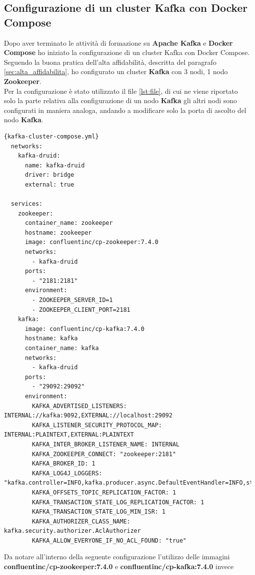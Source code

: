 \subsection{Configurazione di un cluster Kafka con Docker Compose}
Dopo aver terminato le attività di formazione su \textbf{Apache Kafka} e \textbf{Docker Compose} 
ho iniziato la configurazione di un \gls{cluster}{} Kafka con Docker Compose. 
\\Seguendo la buona pratica dell'alta affidabilità, descritta del 
paragrafo \ref{sec:alta_affidabilita}, ho configurato un \gls{cluster}{} \textbf{Kafka} con 3 nodi, 1 nodo \textbf{Zookeeper}.\\
Per la configurazione è stato utilizzato il file \ref{lst:file}, di cui ne viene riportato solo la parte relativa alla configurazione di un nodo \textbf{Kafka} gli altri nodi sono configurati in maniera analoga, andando a modificare
solo la porta di ascolto del nodo \textbf{Kafka}.
\pagebreak
\begin{lstlisting}[caption=\texttt{kafka-cluster-compose.yml}, label=lst:file]{kafka-cluster-compose.yml}
  networks:
    kafka-druid:
      name: kafka-druid
      driver: bridge
      external: true
  
  services:
    zookeeper:
      container_name: zookeeper
      hostname: zookeeper
      image: confluentinc/cp-zookeeper:7.4.0
      networks: 
        - kafka-druid
      ports:
        - "2181:2181"
      environment:
        - ZOOKEEPER_SERVER_ID=1
        - ZOOKEEPER_CLIENT_PORT=2181
    kafka:
      image: confluentinc/cp-kafka:7.4.0
      hostname: kafka
      container_name: kafka
      networks:
        - kafka-druid
      ports:
        - "29092:29092"
      environment:
        KAFKA_ADVERTISED_LISTENERS: INTERNAL://kafka:9092,EXTERNAL://localhost:29092
        KAFKA_LISTENER_SECURITY_PROTOCOL_MAP: INTERNAL:PLAINTEXT,EXTERNAL:PLAINTEXT
        KAFKA_INTER_BROKER_LISTENER_NAME: INTERNAL
        KAFKA_ZOOKEEPER_CONNECT: "zookeeper:2181"
        KAFKA_BROKER_ID: 1
        KAFKA_LOG4J_LOGGERS: "kafka.controller=INFO,kafka.producer.async.DefaultEventHandler=INFO,state.change.logger=INFO"
        KAFKA_OFFSETS_TOPIC_REPLICATION_FACTOR: 1
        KAFKA_TRANSACTION_STATE_LOG_REPLICATION_FACTOR: 1
        KAFKA_TRANSACTION_STATE_LOG_MIN_ISR: 1
        KAFKA_AUTHORIZER_CLASS_NAME: kafka.security.authorizer.AclAuthorizer
        KAFKA_ALLOW_EVERYONE_IF_NO_ACL_FOUND: "true"  
\end{lstlisting}   
Da notare all'interno della seguente configurazione l'utilizzo delle immagini\\ \textbf{confluentinc/cp-zookeeper:7.4.0} e \textbf{confluentinc/cp-kafka:7.4.0} invece 
